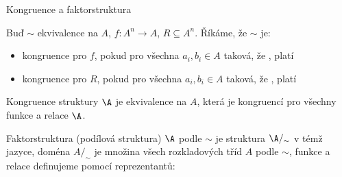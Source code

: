 \documentclass{beamer}
\begin{document}
\begin{frame}{Kongruence a faktorstruktura}
    
    \pause    
    Buď $\sim$ ekvivalence na $A$, $f\colon A^n\to A$, $R\subseteq A^n$. Říkáme, že $\sim$ je:\pause
    \begin{itemize}
        \item \alert{kongruence pro $f$}, pokud pro všechna $a_i,b_i\in A$ taková, že , platí \pause
        \item \alert{kongruence pro $R$}, pokud pro všechna $a_i,b_i\in A$ taková, že , platí \pause
    \end{itemize}    
    \alert{Kongruence} struktury $\A$ je ekvivalence na $A$, která je kongruencí pro všechny funkce a relace $\A$. \pause

    \alert{Faktorstruktura (podílová struktura)} $\A$ podle $\sim$ je struktura \alert{$\A/_\sim$ } v témž jazyce, doména $A/_\sim$ je množina všech rozkladových tříd $A$ podle $\sim$, funkce a relace definujeme \alert{pomocí reprezentantů}:\pause
    
        
\end{frame}
\end{document}
